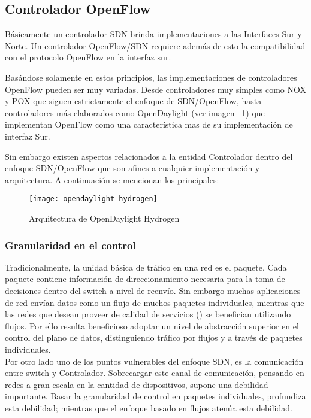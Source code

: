 \subsection{Controlador OpenFlow}
Básicamente un controlador SDN brinda implementaciones a las Interfaces Sur y Norte. Un controlador OpenFlow/SDN requiere adem\'as de esto la compatibilidad con el protocolo OpenFlow en la interfaz sur. 

Basándose solamente en estos principios, las implementaciones de controladores OpenFlow pueden ser muy variadas. Desde controladores muy simples como NOX\cite{ControllersNOX} y POX\cite{ControllersPOX} que siguen estrictamente el enfoque de SDN/OpenFlow, hasta controladores m\'as elaborados como OpenDaylight\cite{ControllersOpendaylight} (ver imagen ~\ref{fig:OpenDayLightHydrogen}) que implementan OpenFlow como una característica mas de su implementaci\'on de interfaz Sur.

Sin embargo existen aspectos relacionados a la entidad Controlador dentro del enfoque SDN/OpenFlow que son afines a cualquier implementaci\'on y arquitectura. A continuaci\'on se mencionan los principales:
  
\begin{figure}[ht!] 
\centering    
\texttt{[image: opendaylight-hydrogen]}
\caption[Arquitectura de OpenDaylight Hydrogen]{Arquitectura de OpenDaylight Hydrogen}
\label{fig:OpenDayLightHydrogen}
\end{figure}

\subsubsection{Granularidad en el control}
Tradicionalmente, la unidad básica de tráfico en una red es el paquete. Cada paquete contiene información de direccionamiento necesaria para la toma de decisiones dentro del switch a nivel de reenvío. Sin embargo muchas aplicaciones de red envían datos como un flujo de muchos paquetes individuales, mientras que las redes que desean proveer de calidad de servicios () se benefician utilizando flujos. Por ello resulta beneficioso adoptar un nivel de abstracción superior en el control del plano de datos, distinguiendo tr\'afico por flujos y a través de paquetes individuales.\\
 
Por otro lado uno de los puntos vulnerables del enfoque SDN, es la comunicación entre switch y Controlador. Sobrecargar este canal de comunicación, pensando en redes a gran escala en la cantidad de dispositivos, supone una debilidad importante. Basar la granularidad de control en paquetes individuales, profundiza esta debilidad; mientras que el enfoque basado en flujos atenúa esta debilidad. 


